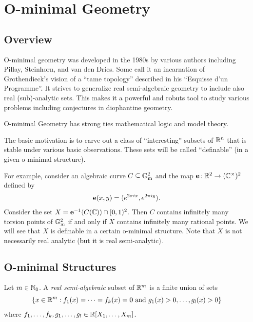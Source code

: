 \chapter{O-minimal Geometry}
\section{Overview}

O-minimal geometry was developed in the 1980s by various authors
including Pillay, Steinhorn, and van den Dries. Some call it an
incarnation of Grothendieck's vision of a ``tame topology'' described
in his ``Esquisse d'un Programme''. It strives to generalize real
semi-algebraic geometry to include also real (sub)-analytic sets.
This makes it a powerful and robuts tool to study various problems
including conjectures in diophantine geometry.

O-minimal Geometry has strong ties mathematical logic and model
theory. 

The basic motivation is to carve out a class of ``interesting'' subsets
of ${\mathbb{R}}^n$ that is stable under various basic observations. These sets
will be called ``definable'' (in a given o-minimal structure). 

For example, consider an algebraic curve $C\subseteq {\mathbb{G}}_{\mathrm{m}}^2$ and
the map $\mathbf{e} \colon{\mathbb{R}}^2\rightarrow ({\mathbb{C}}^\times)^2$ defined by
\begin{equation*}
  \mathbf{e}(x,y) = (e^{2\pi i x},e^{2\pi i y}). 
\end{equation*}
Consider the set $X = \mathbf{e}^{-1}(C({\mathbb{C}})) \cap [0,1)^2$. Then $C$ contains
infinitely many torsion points of ${\mathbb{G}}_{\mathrm{m}}^2$ if and only if $X$
contains infinitely many rational points.
We will see that $X$ is definable in a certain o-minimal structure.
Note that $X$ is not necessarily real analytic (but it is real
semi-analytic). 

\section{O-minimal Structures}

\begin{definition}
  Let $m\in{\mathbb{N}}_0$. 
  A \emph{real semi-algebraic} subset of ${\mathbb{R}}^m$ is a finite union
  of sets    
  \begin{equation*}
    \{x\in{\mathbb{R}}^m :f_1(x) =\cdots = f_k(x) = 0 \text{ and }
    g_1(x)>0,\ldots,g_l(x)>0\}
  \end{equation*}
  where $f_1,\ldots,f_k,g_1,\ldots,g_l\in {\mathbb{R}}[X_1,\ldots,X_m]$.
\end{definition}

